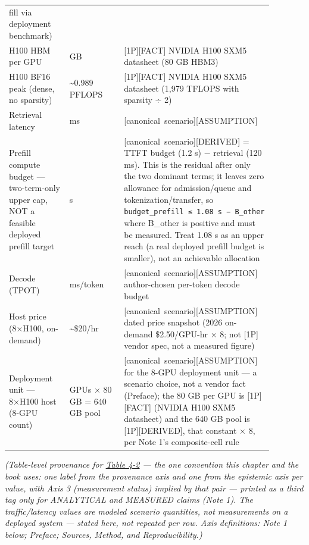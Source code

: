 \begin{longtable}[]{@{}
  >{\raggedright\arraybackslash}p{0.2927\linewidth}
  >{\raggedright\arraybackslash}p{0.2927\linewidth}
  >{\raggedright\arraybackslash}p{0.2927\linewidth}@{}}
fill via deployment benchmark) \\
H100 HBM per GPU & 80 GB & \mbox{{[}1P{]}}\hspace{0pt}\mbox{{[}FACT{]}} NVIDIA H100 SXM5 datasheet
(80 GB HBM3) \\
H100 BF16 peak (dense, no sparsity) & \textasciitilde0.989 PFLOPS &
\mbox{{[}1P{]}}\hspace{0pt}\mbox{{[}FACT{]}} NVIDIA H100 SXM5 datasheet (1,979 TFLOPS with
sparsity ÷ 2) \\
Retrieval latency & 120 ms & \mbox{{[}canonical scenario{]}}\hspace{0pt}\mbox{{[}ASSUMPTION{]}} \\
Prefill compute budget --- two-term-only upper cap, NOT a feasible
deployed prefill target & 1.08 s & \mbox{{[}canonical scenario{]}}\hspace{0pt}\mbox{{[}DERIVED{]}}
= TTFT budget (1.2 s) − retrieval (120 ms). This is the residual after
only the two dominant terms; it leaves zero allowance for
admission/queue and tokenization/transfer, so
\texttt{budget\_prefill\ ≤\ 1.08\ s\ −\ B\_other} where B\_other is
positive and must be measured. Treat 1.08 s as an upper reach (a real
deployed prefill budget is smaller), not an achievable allocation \\
Decode (TPOT) & 25 ms/token & \mbox{{[}canonical scenario{]}}\hspace{0pt}\mbox{{[}ASSUMPTION{]}}
author-chosen per-token decode budget \\
Host price (8×H100, on-demand) & \textasciitilde\$20/hr & \mbox{{[}canonical
scenario{]}}\hspace{0pt}\mbox{{[}ASSUMPTION{]}} dated price snapshot (2026 on-demand
\$2.50/GPU-hr × 8; not \mbox{{[}1P{]}} vendor spec, not a measured figure) \\
Deployment unit --- 8×H100 host (8-GPU count) & 8 GPUs × 80 GB = 640 GB
pool & \mbox{{[}canonical scenario{]}}\hspace{0pt}\mbox{{[}ASSUMPTION{]}} for the 8-GPU deployment
unit --- a scenario choice, not a vendor fact (Preface); the 80 GB per
GPU is \mbox{{[}1P{]}}\hspace{0pt}\mbox{{[}FACT{]}} (NVIDIA H100 SXM5 datasheet) and the 640 GB
pool is \mbox{{[}1P{]}}\hspace{0pt}\mbox{{[}DERIVED{]}}, that constant × 8, per Note 1's
composite-cell rule \\
\end{longtable}

\emph{(Table-level provenance for \hyperref[tab:4.2]{Table 4-2} --- the one convention this
chapter and the book uses: one label from the provenance axis and one
from the epistemic axis per value, with Axis 3 (measurement status)
implied by that pair --- printed as a third tag only for ANALYTICAL and
MEASURED claims (Note 1). The traffic/latency values are modeled
scenario quantities, not measurements on a deployed system --- stated
here, not repeated per row. Axis definitions: Note 1 below; Preface;
Sources, Method, and Reproducibility.)}

